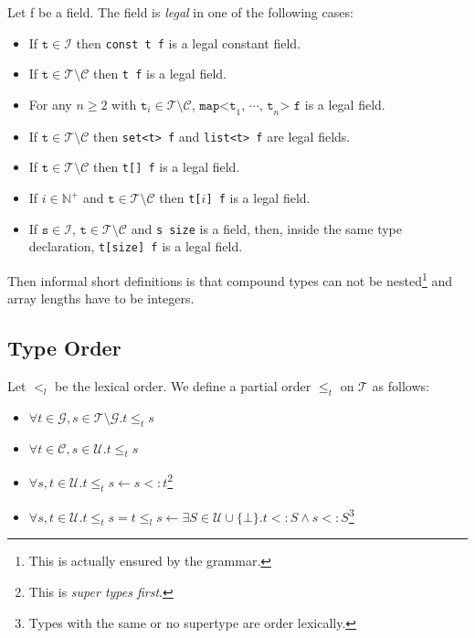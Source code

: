 \documentclass[a4paper,10pt]{article}
\begin{document}
Let f be a field. The field is \textit{legal} in one of the following cases:
\begin{itemize}
 \item If $\texttt{t} \in \mathcal{I}$ then \verb/const t f/ is a legal constant field.
 
 \item If $\texttt{t} \in \mathcal{T}\setminus\mathcal{C}$ then \verb/t f/ is a legal field.
 
 \item For any $n \geq 2$ with $\texttt{t}_i \in \mathcal{T}\setminus\mathcal{C}$, $\texttt{map<t}_1\texttt{, }\cdots\texttt{, t}_n\texttt{> f}$ is a legal field.
 
 \item If $\texttt{t} \in \mathcal{T}\setminus\mathcal{C}$ then \verb/set<t> f/ and \verb/list<t> f/ are legal fields.
 
 \item If $\texttt{t} \in \mathcal{T}\setminus\mathcal{C}$ then \verb/t[] f/ is a legal field.
 
 \item If $i \in \mathbb{N}^+$ and $\texttt{t} \in \mathcal{T}\setminus\mathcal{C}$ then \verb/t[/$i$\verb/] f/ is a legal field.
 
 \item If $\texttt{s} \in \mathcal{I}$, $\texttt{t} \in \mathcal{T}\setminus\mathcal{C}$ and \verb/s size/ is a field, then, inside the same type declaration, \verb/t[size] f/ is a legal field.
\end{itemize}

Then informal short definitions is that compound types can not be nested\footnote{This is actually ensured by the grammar.} and array lengths have to be integers.

\subsection*{Type Order}

Let $<_l$ be the lexical order. We define a partial order $\leq_t$ on $\mathcal{T}$ as follows:
\begin{itemize}
 \item $\forall t \in \mathcal{G}, s \in \mathcal{T}\setminus\mathcal{G}. t \leq_t s$
 \item $\forall t \in \mathcal{C}, s \in \mathcal{U}. t \leq_t s$
 \item $\forall s,t \in \mathcal{U}. t \leq_t s \leftarrow s <: t $\footnote{This is \textit{super types first}.}
 \item $\forall s,t \in \mathcal{U}. t \leq_t s = t \leq_l s\leftarrow \exists S \in \mathcal{U} \cup \{\bot\}. t <: S \wedge s <: S $\footnote{Types with the same or no supertype are order lexically.}
\end{itemize}
\end{document}
